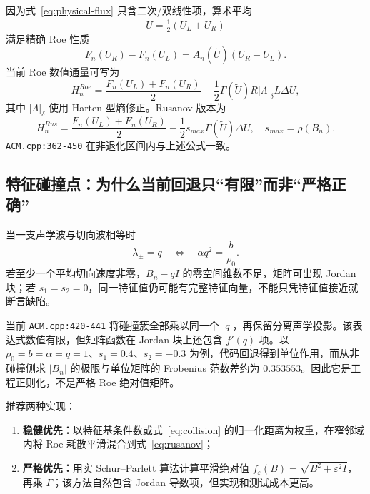 \documentclass[UTF8,11pt,a4paper]{ctexart}
\newcommand{\code}[1]{\nolinkurl{#1}}
\begin{document}
因为式~\eqref{eq:physical-flux} 只含二次/双线性项，算术平均
\begin{equation}
 \widetilde U=\tfrac12(U_L+U_R)
\end{equation}
满足精确 Roe 性质
\begin{equation}
 F_n(U_R)-F_n(U_L)=A_n(\widetilde U)(U_R-U_L).
\end{equation}
当前 Roe 数值通量可写为
\begin{equation}
 H_n^{Roe}=\frac{F_n(U_L)+F_n(U_R)}{2}
 -\frac12\Gamma(\widetilde U)R|\Lambda|_{\delta}L\Delta U,
 \label{eq:roe-flux}
\end{equation}
其中 $|\Lambda|_\delta$ 使用 Harten 型熵修正。Rusanov 版本为
\begin{equation}
 H_n^{Rus}=\frac{F_n(U_L)+F_n(U_R)}{2}
 -\frac12 s_{max}\Gamma(\widetilde U)\Delta U,
 \quad s_{max}=\rho(B_n).
 \label{eq:rusanov}
\end{equation}
\code{ACM.cpp:362-450} 在非退化区间内与上述公式一致。

\subsection{特征碰撞点：为什么当前回退只“有限”而非“严格正确”}

当一支声学波与切向波相等时
\begin{equation}
 \lambda_{\pm}=q
 \quad\Longleftrightarrow\quad
 \alpha q^2=\frac{b}{\rho_0}.
 \label{eq:collision}
\end{equation}
若至少一个平均切向速度非零，$B_n-qI$ 的零空间维数不足，矩阵可出现 Jordan 块；若 $s_1=s_2=0$，同一特征值仍可能有完整特征向量，不能只凭特征值接近就断言缺陷。

当前 \code{ACM.cpp:420-441} 将碰撞簇全部乘以同一个 $|q|$，再保留分离声学投影。该表达式数值有限，但矩阵函数在 Jordan 块上还包含 $f'(q)$ 项。以 $\rho_0=b=\alpha=q=1$、$s_1=0.4$、$s_2=-0.3$ 为例，代码回退得到单位作用，而从非碰撞侧求 $|B_n|$ 的极限与单位矩阵的 Frobenius 范数差约为 $0.353553$。因此它是工程正则化，不是严格 Roe 绝对值矩阵。

推荐两种实现：

\begin{enumerate}
  \item \textbf{稳健优先：}以特征基条件数或式~\eqref{eq:collision} 的归一化距离为权重，在窄邻域内将 Roe 耗散平滑混合到式~\eqref{eq:rusanov}；
  \item \textbf{严格优先：}用实 Schur--Parlett 算法计算平滑绝对值 $f_\varepsilon(B)=\sqrt{B^2+\varepsilon^2I}$，再乘 $\Gamma$；该方法自然包含 Jordan 导数项，但实现和测试成本更高。
\end{enumerate}
\end{document}
